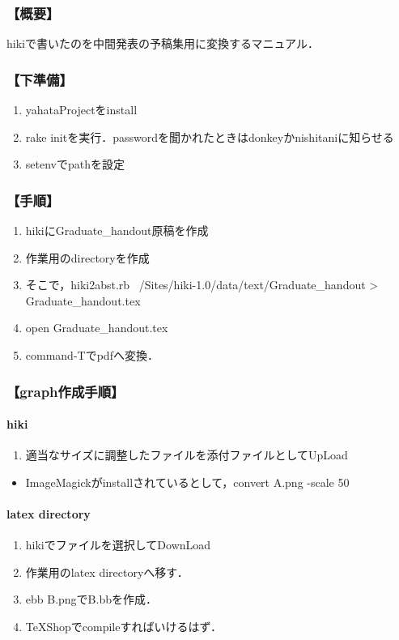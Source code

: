 
\subsubsection{【概要】}
hikiで書いたのを中間発表の予稿集用に変換するマニュアル．

\subsubsection{【下準備】}\begin{enumerate}
\item yahataProjectをinstall
\item rake initを実行．passwordを聞かれたときはdonkeyかnishitaniに知らせる
\item setenvでpathを設定
\end{enumerate}
\subsubsection{【手順】}\begin{enumerate}
\item hikiにGraduate\_handout原稿を作成
\item 作業用のdirectoryを作成
\item そこで，hiki2abst.rb ~/Sites/hiki-1.0/data/text/Graduate\_handout > Graduate\_handout.tex
\item open Graduate\_handout.tex
\item command-Tでpdfへ変換．
\end{enumerate}
\subsubsection{【graph作成手順】}
\paragraph{hiki}\begin{enumerate}
\item 適当なサイズに調整したファイルを添付ファイルとしてUpLoad
\end{enumerate}\begin{itemize}
\item ImageMagickがinstallされているとして，convert A.png -scale 50%
\end{itemize}
\paragraph{latex directory}\begin{enumerate}
\item hikiでファイルを選択してDownLoad
\item 作業用のlatex directoryへ移す．
\item ebb B.pngでB.bbを作成．
\item TeXShopでcompileすればいけるはず．
\end{enumerate}
